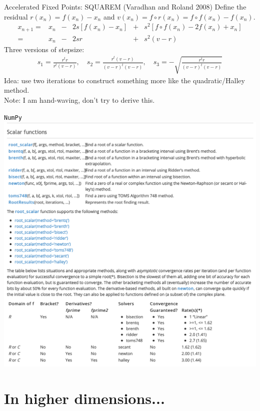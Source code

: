 \documentclass[xcolor=pdftex,dvipsnames,table,mathserif,aspectratio=169]{beamer}
\begin{document}
\begin{frame}{Accelerated Fixed Points: SQUAREM (Varadhan and Roland 2008)}
Define the residual $r(x_n) = f(x_n) - x_n$ and $v(x_n)=f \circ r \left(x_{n}\right)=f \circ f \left(x_{n}\right)-f\left(x_{n}\right)$.
\begin{align*}
x_{n+1}=& x_{n}&-&2 s\left[f\left(x_{n}\right)-x_{n}\right] &+&s^{2}\left[f \circ f\left(x_{n}\right)-2 f\left(x_{n}\right)+x_{n}\right] \\
=& x_{n}&-&2 s r &+&s^{2}(v-r)
\end{align*}
Three versions of stepsize:
\begin{align*}
s_1 =\frac{r^{t} r}{r^{t}(v-r)}, \quad
s_2 =\frac{r^{t}(v-r)}{(v-r)^{t}(v-r)}, \quad
s_3 =-\sqrt{\frac{r^{t} r}{(v-r)^{t}(v-r)}}
\end{align*}
Idea: use two iterations to construct something more like the quadratic/Halley method.\\
\alert{Note: I am hand-waving, don't try to derive this.}
\end{frame}


\begin{frame}{\texttt{NumPy}}
\includegraphics[height=0.9\textheight]{./resources/scipy_roots1.png}
\end{frame}


\section{In higher dimensions...}
\end{document}
